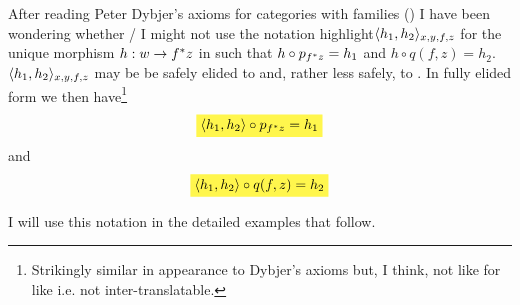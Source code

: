 \documentclass[10pt,a4paper]{article}
\theoremstyle{remark}
\begin{document}
After reading Peter Dybjer's axioms for categories with families (\cite{}) I have been wondering whether / I might not use the notation highlight{$\langle h_1,h_2\rangle_{x,y,f,z}$}  for the unique morphism   
$h:w \rightarrow f ^* z$ in  such that
$h \circ p_{f ^* z} = h_1$ and $h \circ q(f,z) = h_2$.\\

$\langle h_1,h_2\rangle_{x,y,f,z}$ may be be safely elided to  and, rather less safely, to .
In fully elided form we then  have\footnote{Strikingly similar in appearance to Dybjer's axioms but, I think, not like for like i.e. not inter-translatable.} 
\begin{equation}
\mbox{\highlight{$\tuple{h_1,h_2} \circ p_{f^*z} = h_1$}}
\end{equation}
and
\begin{equation}
\mbox{\highlight{$\tuple{h_1,h_2} \circ q(f,z) = h_2$}}
\end{equation}

I will use this notation in the detailed examples that follow.
\end{document}
